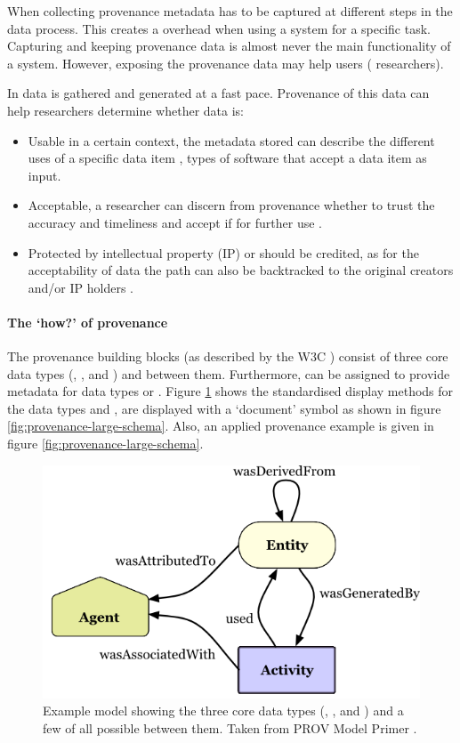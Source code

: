 When collecting provenance  metadata has to be captured at different steps in the data process.
This creates a overhead when using a system for a specific task.
Capturing and keeping provenance data is almost never the main functionality of a system.
However, exposing the provenance data may help users (\ie{} researchers).

In \escience{} data is gathered and generated at a fast pace.
Provenance of this data can help researchers determine whether data is:

\begin{itemize}
	\item Usable in a certain context, the metadata stored can describe the different uses of a specific data item \cite{dsp1simmhan}, \eg{} types of software that accept a data item as input.
	\item Acceptable, a researcher can discern from provenance whether to trust the accuracy and timeliness and accept if for further use \cite{dsp1simmhan,dsp3buneman}.
	\item Protected by intellectual property (IP) or should be credited, as for the acceptability of data the path can also be backtracked to the original creators and/or IP holders \cite{dsp1simmhan}.
\end{itemize}

\paragraph{The `how?' of provenance}
\label{provenance-how}

The provenance building blocks (as described by the W3C \cite{dsp8gil}) consist of three core data types (\agent{}, \entity{}, and \activity{}) and \relations{} between them.
Furthermore, \attributes{} can be assigned to provide metadata for data types or \relations{}.
Figure \ref{fig:provenance-overview} shows the standardised display methods for the data types and \relations{}, \attributes{} are displayed with a `document' symbol as shown in figure \ref{fig:provenance-large-schema}.
Also, an applied provenance example is given in figure \ref{fig:provenance-large-schema}.

\begin{figure}[!tbhp]
	\centering
	\includegraphics[width=0.5\linewidth]{images/provenance-overview}
	\caption{Example model showing the three core data types (\agent{}, \entity{}, and \activity{}) and a few of all possible \relations{} between them. 
		Taken from PROV Model Primer \cite{dsp8gil}.}
	\label{fig:provenance-overview}
\end{figure}

